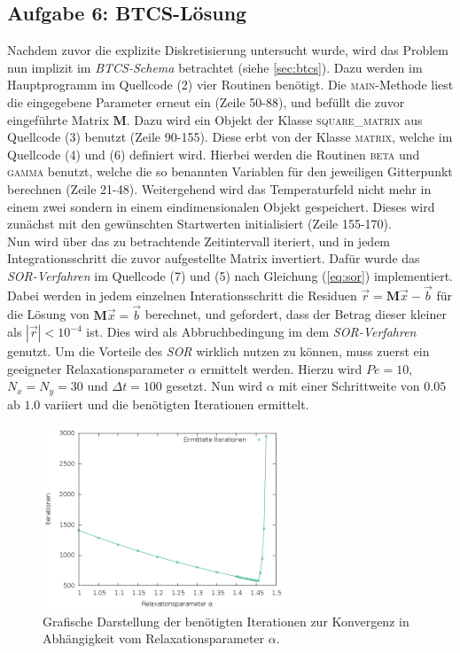 \documentclass[12pt,a4paper,titlepage,headinclude,bibtotoc]{scrartcl}
\begin{document}
\subsection{Aufgabe 6: BTCS-Lösung}
\label{sec:task6}
Nachdem zuvor die explizite Diskretisierung untersucht wurde, wird das Problem nun implizit im \textit{BTCS-Schema} betrachtet (siehe \ref{sec:btcs}). Dazu werden im Hauptprogramm im Quellcode (2) vier Routinen benötigt.
Die \textsc{main}-Methode liest die eingegebene Parameter erneut ein (Zeile 50-88), und befüllt die zuvor eingeführte Matrix $\textbf{M}$. Dazu wird ein Objekt der Klasse \textsc{square\_matrix} aus Quellcode (3) benutzt (Zeile 90-155). Diese erbt von der Klasse \textsc{matrix}, welche im Quellcode (4) und (6) definiert wird. Hierbei werden die Routinen \textsc{beta} und \textsc{gamma} benutzt, welche die so benannten Variablen für den jeweiligen Gitterpunkt berechnen (Zeile 21-48). Weitergehend wird das Temperaturfeld nicht mehr in einem zwei sondern in einem eindimensionalen Objekt gespeichert. Dieses wird zunächst mit den gewünschten Startwerten initialisiert (Zeile 155-170).\\
Nun wird über das zu betrachtende Zeitintervall iteriert, und in jedem Integrationsschritt die zuvor aufgestellte Matrix invertiert. Dafür wurde das \textit{SOR-Verfahren} im Quellcode (7) und (5) nach Gleichung (\ref{eq:sor}) implementiert. Dabei werden in jedem einzelnen Interationsschritt die Residuen $\vec{r} = \textbf{M} \vec{x}-\vec{b}$ für die Lösung von $\textbf{M} \vec{x} = \vec{b}$ berechnet, und gefordert, dass der Betrag dieser kleiner als $|\vec{r}| < 10^{-4}$ ist. Dies wird als Abbruchbedingung im dem \textit{SOR-Verfahren} genutzt. Um die Vorteile des \textit{SOR} wirklich nutzen zu können, muss zuerst ein geeigneter Relaxationsparameter $\alpha$ ermittelt werden. Hierzu wird $Pe=10$, $N_x=N_y = 30$ und $\Delta t=100$ gesetzt. Nun wird $\alpha$ mit einer Schrittweite von $0.05$ ab $1.0$ variiert und die benötigten Iterationen ermittelt. 
\begin{figure}[H]
 \centering
   \includegraphics[width=0.65\textwidth]{res/task6/sor_parameter.png}
   \caption{Grafische Darstellung der benötigten Iterationen zur Konvergenz in Abhängigkeit vom Relaxationsparameter $\alpha$.}
 \label{fig:task6_param_comp}
\end{figure}
\end{document}
